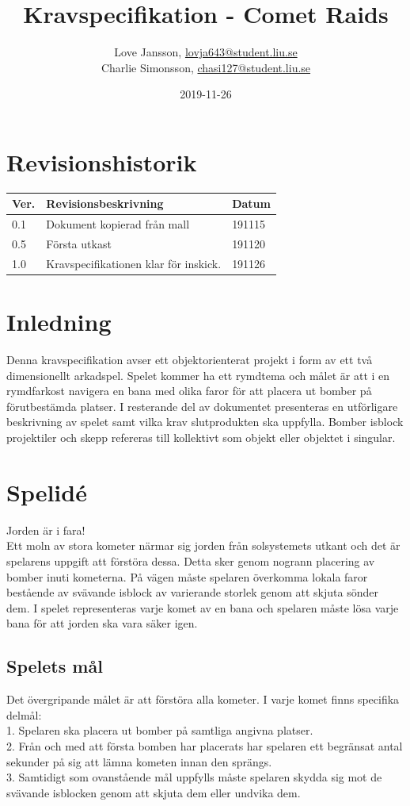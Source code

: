 \documentclass{TDP005mall}
\author{Love Jansson, \url{lovja643@student.liu.se}\\
  Charlie Simonsson, \url{chasi127@student.liu.se}}
\title{Kravspecifikation - Comet Raids}
\date{2019-11-26}
\begin{document}
\projectpage
\section{Revisionshistorik}
\begin{table}[!h]
\begin{tabularx}{\linewidth}{|l|X|l|}
\hline
Ver. & Revisionsbeskrivning & Datum \\\hline
0.1 & Dokument kopierad från mall & 191115 \\\hline
0.5 & Första utkast & 191120\\\hline
1.0 & Kravspecifikationen klar för inskick.& 191126\\\hline



\end{tabularx}
\end{table}

\tableofcontents
\pagebreak 

\section{Inledning}
Denna kravspecifikation avser ett objektorienterat projekt i form av ett två 
dimensionellt arkadspel. Spelet kommer ha ett rymdtema och målet är att i en 
rymdfarkost navigera en bana med olika faror för att placera ut bomber på 
förutbestämda platser. I resterande del av dokumentet presenteras en utförligare
beskrivning av spelet samt vilka krav slutprodukten ska uppfylla. Bomber
isblock projektiler och skepp refereras till kollektivt som objekt eller
objektet i singular.

\section{Spelidé}
Jorden är i fara!\\
Ett moln av stora kometer närmar sig jorden från solsystemets utkant och det är 
spelarens uppgift att förstöra dessa. Detta sker genom nogrann placering av 
bomber inuti kometerna. På vägen måste spelaren överkomma lokala faror bestående
av svävande isblock av varierande storlek genom att skjuta sönder dem.
I spelet representeras varje komet av en bana och spelaren måste lösa varje 
bana för att jorden ska vara säker igen. 

\subsection{Spelets mål}
Det övergripande målet är att förstöra alla kometer. I varje komet finns 
specifika delmål:\\
1. Spelaren ska placera ut bomber på samtliga angivna platser.\\
2. Från och med att första bomben har placerats har spelaren ett begränsat antal
sekunder på sig att lämna kometen innan den sprängs.\\
3. Samtidigt som ovanstående mål uppfylls måste spelaren  skydda sig mot de
svävande isblocken genom att skjuta dem eller undvika dem.
\end{document}
